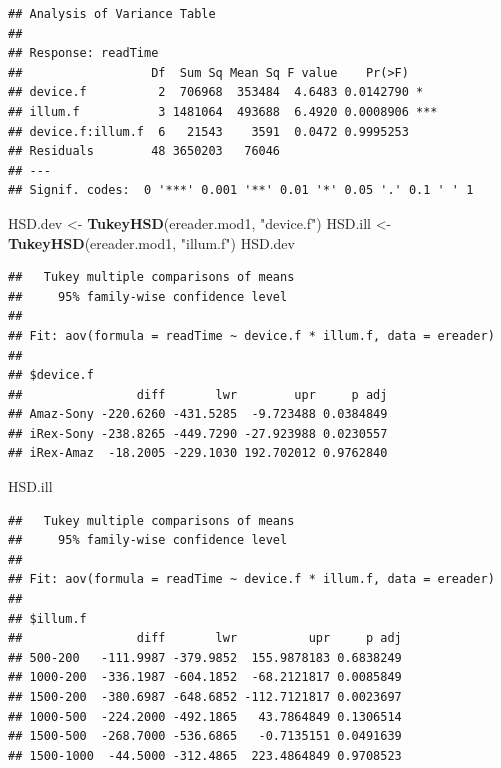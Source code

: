 \documentclass[
]{book}
\newenvironment{Shaded}{\begin{snugshade}}{\end{snugshade}}
\newcommand{\FunctionTok}[1]{\textcolor[rgb]{0.13,0.29,0.53}{\textbf{#1}}}
\newcommand{\NormalTok}[1]{#1}
\newcommand{\OtherTok}[1]{\textcolor[rgb]{0.56,0.35,0.01}{#1}}
\newcommand{\StringTok}[1]{\textcolor[rgb]{0.31,0.60,0.02}{#1}}
\begin{document}
\begin{verbatim}
## Analysis of Variance Table
## 
## Response: readTime
##                  Df  Sum Sq Mean Sq F value    Pr(>F)    
## device.f          2  706968  353484  4.6483 0.0142790 *  
## illum.f           3 1481064  493688  6.4920 0.0008906 ***
## device.f:illum.f  6   21543    3591  0.0472 0.9995253    
## Residuals        48 3650203   76046                      
## ---
## Signif. codes:  0 '***' 0.001 '**' 0.01 '*' 0.05 '.' 0.1 ' ' 1
\end{verbatim}

\begin{Shaded}
\begin{Highlighting}[]
\NormalTok{HSD.dev }\OtherTok{\textless{}{-}} \FunctionTok{TukeyHSD}\NormalTok{(ereader.mod1, }\StringTok{"device.f"}\NormalTok{)}
\NormalTok{HSD.ill }\OtherTok{\textless{}{-}} \FunctionTok{TukeyHSD}\NormalTok{(ereader.mod1, }\StringTok{"illum.f"}\NormalTok{)}
\NormalTok{HSD.dev}
\end{Highlighting}
\end{Shaded}

\begin{verbatim}
##   Tukey multiple comparisons of means
##     95% family-wise confidence level
## 
## Fit: aov(formula = readTime ~ device.f * illum.f, data = ereader)
## 
## $device.f
##                diff       lwr        upr     p adj
## Amaz-Sony -220.6260 -431.5285  -9.723488 0.0384849
## iRex-Sony -238.8265 -449.7290 -27.923988 0.0230557
## iRex-Amaz  -18.2005 -229.1030 192.702012 0.9762840
\end{verbatim}

\begin{Shaded}
\begin{Highlighting}[]
\NormalTok{HSD.ill}
\end{Highlighting}
\end{Shaded}

\begin{verbatim}
##   Tukey multiple comparisons of means
##     95% family-wise confidence level
## 
## Fit: aov(formula = readTime ~ device.f * illum.f, data = ereader)
## 
## $illum.f
##                diff       lwr          upr     p adj
## 500-200   -111.9987 -379.9852  155.9878183 0.6838249
## 1000-200  -336.1987 -604.1852  -68.2121817 0.0085849
## 1500-200  -380.6987 -648.6852 -112.7121817 0.0023697
## 1000-500  -224.2000 -492.1865   43.7864849 0.1306514
## 1500-500  -268.7000 -536.6865   -0.7135151 0.0491639
## 1500-1000  -44.5000 -312.4865  223.4864849 0.9708523
\end{verbatim}
\end{document}
